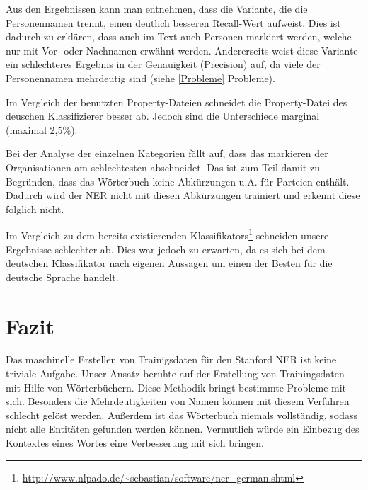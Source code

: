 \documentclass[a4paper]{article}
\begin{document}
	Aus den Ergebnissen kann man entnehmen, dass die Variante, die die Personennamen trennt, einen deutlich besseren Recall-Wert aufweist.
	Dies ist dadurch zu erklären, dass auch im Text auch Personen markiert werden, welche nur mit Vor- oder Nachnamen erwähnt werden.
	Andererseits weist diese Variante ein schlechteres Ergebnis in der Genauigkeit (Precision) auf, da viele der Personennamen mehrdeutig sind (siehe \ref{Probleme} Probleme).

	Im Vergleich der benutzten Property-Dateien schneidet die Property-Datei des deuschen Klassifizierer besser ab.
	Jedoch sind die Unterschiede marginal (maximal 2,5\%).

	Bei der Analyse der einzelnen Kategorien fällt auf, dass das markieren der Organisationen am schlechtesten abschneidet.
	Das ist zum Teil damit zu Begründen, dass das Wörterbuch keine Abkürzungen u.A. für Parteien enthält.
	Dadurch wird der NER nicht mit diesen Abkürzungen trainiert und erkennt diese folglich nicht.

	Im Vergleich zu dem bereits existierenden Klassifikators\footnote{\url{http://www.nlpado.de/~sebastian/software/ner_german.shtml}} schneiden unsere Ergebnisse schlechter ab.
	Dies war jedoch zu erwarten, da es sich bei dem deutschen Klassifikator nach eigenen Aussagen um einen der Besten für die deutsche Sprache handelt.

\section{Fazit}
	Das maschinelle Erstellen von Trainigsdaten für den Stanford NER ist keine triviale Aufgabe.
	Unser Ansatz beruhte auf der Erstellung von Trainingsdaten mit Hilfe von Wörterbüchern.
	Diese Methodik bringt bestimmte Probleme mit sich.
	Besonders die Mehrdeutigkeiten von Namen können mit diesem Verfahren schlecht gelöst werden.
	Außerdem ist das Wörterbuch niemals vollständig, sodass nicht alle Entitäten gefunden werden können.
	Vermutlich würde ein Einbezug des Kontextes eines Wortes eine Verbesserung mit sich bringen.
\end{document}
